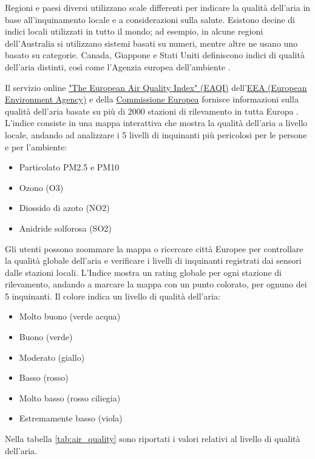 Regioni e paesi diversi utilizzano scale differenti per indicare la qualità dell'aria in base all'inquinamento locale e
a considerazioni sulla salute. Esistono decine di indici locali utilizzati in tutto il mondo;
ad esempio, in alcune regioni dell'Australia si utilizzano sistemi basati su numeri, mentre altre ne usano uno basato
su categorie. Canada, Giappone e Stati Uniti definiscono indici di qualità dell'aria distinti, così come
l'Agenzia europea dell'ambiente \cite{EuropeanEnvironmentAgency}.

Il servizio online \href{https://airindex.eea.europa.eu/AQI/index.html}{"The European Air Quality Index" (EAQI)} dell'\href{https://www.eea.europa.eu/it}{EEA (European Environment Agency)} e
della \href{https://commission.europa.eu/index_it}{Commissione Europea} fornisce informazioni sulla qualità dell'aria basate su più di 2000 stazioni di rilevamento
in tutta Europa \cite{EEA2017IndiceEuropeo}. L'indice consiste in una mappa interattiva che mostra la qualità dell'aria a livello locale,
andando ad analizzare i 5 livelli di inquinanti più pericolosi per le persone e per l'ambiente:

\begin{itemize}
  \item Particolato PM2.5 e PM10
  \item Ozono (O3)
  \item Diossido di azoto (NO2)
  \item Anidride solforosa (SO2)
\end{itemize}

Gli utenti possono zoommare la mappa o ricercare città Europee per controllare la qualità globale dell'aria e verificare i livelli di inquinanti registrati dai sensori dalle stazioni locali. L'Indice mostra un rating globale per ogni stazione di rilevamento, andando a marcare la mappa con un punto colorato, per ognuno dei 5 inquinanti. Il colore indica un livello di qualità dell'aria:
\begin{itemize}
  \item Molto buono (verde acqua)
  \item Buono (verde)
  \item Moderato (giallo)
  \item Basso (rosso)
  \item Molto basso (rosso ciliegia)
  \item Estremamente basso (viola)
\end{itemize}

Nella tabella \ref{tab:air_quality} sono riportati i valori relativi al livello di qualità dell'aria.

